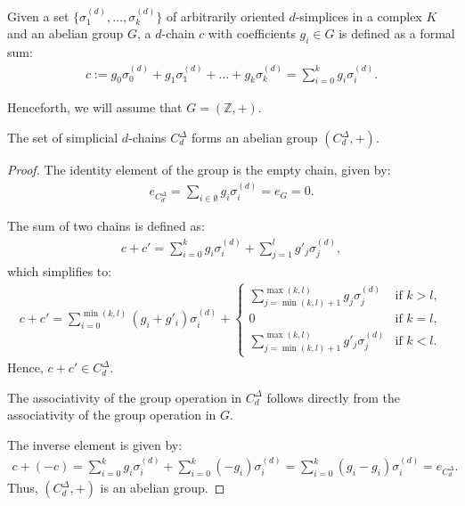 \begin{definition}[$d$-Chain]{\cite[\S 2.3]{zomorodian2004computing}}
\label{d-Chain}
Given a set \(\{\sigma_{1}^{(d)}, \ldots, \sigma_{k}^{(d)}\}\) of arbitrarily oriented \(d\)-simplices in a complex \(K\) and an abelian group \(G\), a \(d\)-chain \(c\) with coefficients \(g_{i} \in G\) is defined as a formal sum:
\begin{align}
c := g_{0}\sigma^{(d)}_{0} + g_{1}\sigma^{(d)}_{1} + \ldots + g_{k}\sigma^{(d)}_{k} = \sum_{i=0}^{k} g_{i}\sigma^{(d)}_{i}.
\end{align}
\end{definition}

Henceforth, we will assume that \( G = (\mathbb{Z}, +) \).

\begin{lemma}
The set of simplicial \( d \)-chains \( C^{\Delta}_{d} \) forms an abelian group \( (C^{\Delta}_{d}, +) \).
\end{lemma}

\begin{proof}
The identity element of the group is the empty chain, given by:
\begin{align}
e_{C^{\Delta}_d} = \sum_{i \in \emptyset} g_{i} \sigma_{i}^{(d)} = e_{G} = 0.
\end{align}

The sum of two chains is defined as:
\begin{align}
c + c' = \sum_{i=0}^{k} g_{i} \sigma_{i}^{(d)} + \sum_{j=1}^{l} g'_{j} \sigma_{j}^{(d)},
\end{align}
which simplifies to:
\begin{align}
c + c' = \sum_{i=0}^{\min(k, l)} (g_{i} + g'_{i}) \sigma_{i}^{(d)} + 
\begin{cases}
\sum_{j=\min(k, l)+1}^{\max(k, l)} g_{j} \sigma_{j}^{(d)} & \text{if } k > l, \\
0 & \text{if } k = l, \\
\sum_{j=\min(k, l)+1}^{\max(k, l)} g'_{j} \sigma_{j}^{(d)} & \text{if } k < l.
\end{cases}
\end{align}
Hence, \( c + c' \in C^{\Delta}_{d} \).

The associativity of the group operation in \( C^{\Delta}_{d} \) follows directly from
the associativity of the group operation in \( G \).

The inverse element is given by:
\begin{align}
c + (-c) = \sum_{i=0}^{k} g_{i} \sigma_{i}^{(d)} + \sum_{i=0}^{k} (-g_{i}) \sigma_{i}^{(d)} = \sum_{i=0}^{k} (g_{i} - g_{i}) \sigma_{i}^{(d)} = e_{C^{\Delta}_d}.
\end{align}
Thus, \( (C^{\Delta}_{d}, +) \) is an abelian group.
\end{proof}

